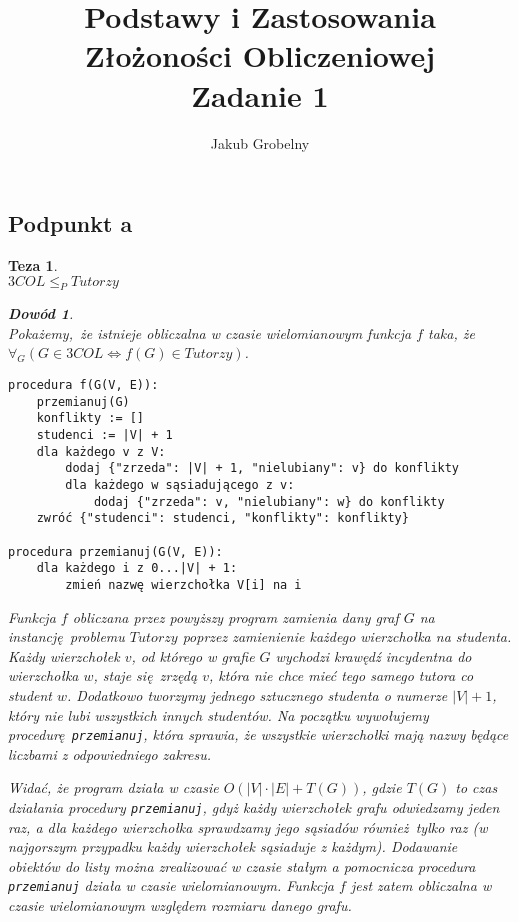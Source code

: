 \documentclass[12pt]{article}
\title{\bfseries Podstawy i Zastosowania Złożoności Obliczeniowej\\\Large Zadanie 1}
\date{}
\author{\Large Jakub Grobelny}
\newtheorem*{theorem*}{Teza}
\newtheorem*{proof*}{Dowód}
\begin{document}
\begin{titlepage}
\maketitle
\thispagestyle{empty}

\hrulefill
\section{Podpunkt a}
\begin{theorem*}\,\\
$3COL \leq_P Tutorzy$
    \begin{proof*} \,\\\normalfont    
    Pokażemy, że istnieje obliczalna w czasie wielomianowym funkcja $f$ taka, 
    że $\forall_G(G \in 3COL \Leftrightarrow f(G) \in Tutorzy)$.
    
\begin{verbatim}
procedura f(G(V, E)):
    przemianuj(G)
    konflikty := []
    studenci := |V| + 1
    dla każdego v z V:
        dodaj {"zrzeda": |V| + 1, "nielubiany": v} do konflikty
        dla każdego w sąsiadującego z v:
            dodaj {"zrzeda": v, "nielubiany": w} do konflikty
    zwróć {"studenci": studenci, "konflikty": konflikty}

procedura przemianuj(G(V, E)):
    dla każdego i z 0...|V| + 1:
        zmień nazwę wierzchołka V[i] na i

\end{verbatim}

Funkcja $f$ obliczana przez powyższy program zamienia dany graf $G$ na 
instancję problemu $Tutorzy$ poprzez zamienienie każdego wierzchołka na 
studenta. Każdy wierzchołek $v$, od którego w grafie $G$ wychodzi krawędź 
incydentna do wierzchołka $w$, staje się \textit{zrzędą} $v$, która nie chce 
mieć tego samego tutora co student $w$. Dodatkowo tworzymy jednego sztucznego 
studenta o numerze $|V|+1$, który nie lubi wszystkich innych studentów. Na początku wywołujemy procedurę \texttt{przemianuj}, która sprawia, że wszystkie wierzchołki mają nazwy będące liczbami z odpowiedniego zakresu.

Widać, że program działa w czasie $O(|V|\cdot|E|+T(G))$, gdzie 
$T(G)$ to czas działania procedury \texttt{przemianuj}, gdyż każdy 
wierzchołek grafu odwiedzamy jeden raz, a dla każdego wierzchołka sprawdzamy 
jego sąsiadów również tylko raz (w najgorszym przypadku każdy wierzchołek 
sąsiaduje z każdym). Dodawanie obiektów do listy można zrealizować w czasie 
stałym a pomocnicza procedura \texttt{przemianuj} działa w czasie 
wielomianowym. Funkcja $f$ jest zatem obliczalna w czasie wielomianowym
względem rozmiaru danego grafu.


\end{proof*}
\end{theorem*}
\end{titlepage}
\end{document}
